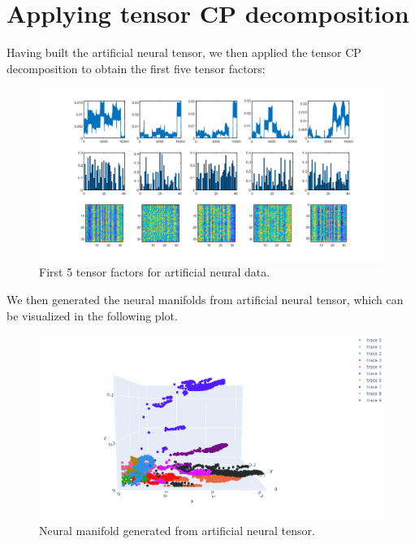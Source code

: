 \section{Applying tensor CP decomposition}
Having built the artificial neural tensor, we then applied the tensor CP decomposition to obtain the first five tensor factors: 
      \begin{figure}[H]
        \centering
            \includegraphics[width=\textwidth]{artificial-tensor/results/nonneg_factors_3D.png}
            \caption{First 5 tensor factors for artificial neural data.}
        \end{figure} 

We then generated the neural manifolds from artificial neural tensor, which can be visualized in the following plot. 
    \begin{figure}[H]
        \centering
            \includegraphics[width=\textwidth]{artificial-tensor/results/TCA_3D.png}
            \caption{Neural manifold generated from artificial neural tensor.}
        \end{figure} 
